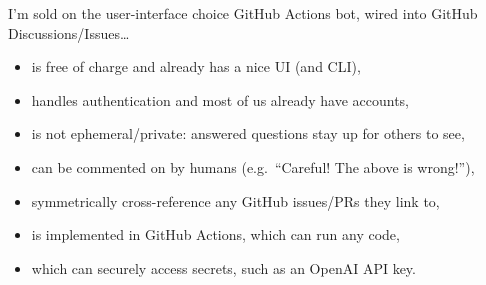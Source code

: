 \documentclass[aspectratio=169]{beamer}
\begin{document}
\begin{frame}{I'm sold on the user-interface choice}
\large
\vspace{0.35 cm}
GitHub Actions bot, wired into GitHub Discussions/Issues\ldots

\vspace{0.2 cm}
\begin{itemize}\setlength{\itemsep}{0.2 cm}
\item is free of charge and already has a nice UI (and CLI),
\item handles authentication and most of us already have accounts,
\item is not ephemeral/private: answered questions stay up for others to see,
\item can be commented on by humans (e.g.\ ``Careful! The above is wrong!''),
\item symmetrically cross-reference any GitHub issues/PRs they link to,
\item is implemented in GitHub Actions, which can run any code,
\item which can securely access secrets, such as an OpenAI API key.
\end{itemize}

\vspace{0.35 cm}

\vspace{0.35 cm}

\end{frame}
\end{document}
